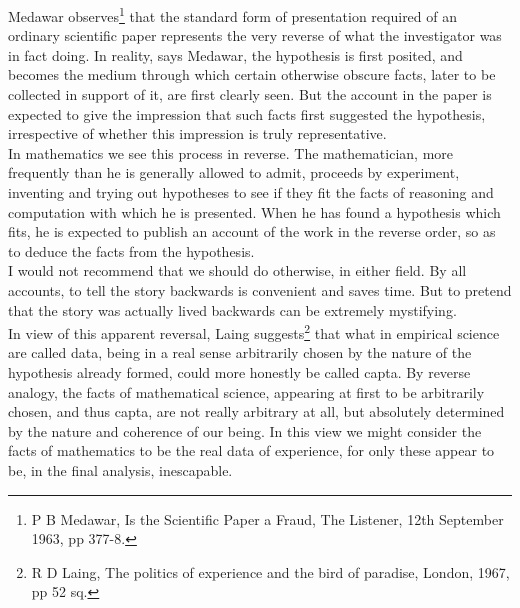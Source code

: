 \documentclass[a4paper]{article}
\theoremstyle{remark}
\begin{document}
Medawar observes\footnote{P B Medawar, Is the Scientific Paper a Fraud, The  Listener, 12th September 1963, pp 377-8.}  that  the  standard  form   of  presentation  required   of  an   ordinary   scientific   paper   represents   the   very   reverse  of  what  the  investigator  was  in  fact  doing.  In  reality,  says  Medawar,  the  hypothesis  is  first  posited,  and  becomes  the  medium  through  which  certain  otherwise  obscure  facts,   later   to  be  collected  in  support  of  it,  are  first  clearly  seen.  But  the  account  in  the  paper  is  expected  to  give  the  impression   that   such  facts  first  suggested  the  hypothesis,  irrespective  of  whether  this  impression  is truly  representative.\\

In  mathematics  we  see  this  process  in  reverse.  The  mathematician, more frequently  than  he  is generally  allowed  to  admit,  proceeds  by  experiment,  inventing  and  trying  out   hypotheses   to  see  if  they  fit  the  facts  of  reasoning  and  computation  with  which  he  is  presented.  When  he  has  found  a  hypothesis  which  fits,  he  is  expected  to  publish  an  account  of  the  work  in  the  reverse  order,  so  as  to  deduce  the  facts  from  the  hypothesis. \\

I   would  not   recommend   that   we  should  do   otherwise,   in   either   field.   By   all  accounts,  to   tell  the   story   backwards   is   convenient  and  saves  time.  But  to  pretend  that  the  story  was  actually  lived  backwards  can  be  extremely  mystifying.\\

In view of this apparent reversal, Laing suggests\footnote{R D Laing, The politics of experience and the bird of paradise, London, 1967, pp 52 sq.}  that  what in empirical  science  are  called  data,  being  in  a  real  sense  arbi­trarily  chosen  by  the  nature  of  the  hypothesis  already  formed,  could  more  honestly  be  called  capta.   By  reverse  analogy,  the  facts  of mathematical  science, appearing at  first to  be  arbitrarily  chosen,   and   thus   capta,   are  not   really   arbitrary   at  all,   but   absolutely  determined  by the nature and  coherence  of our  being.  In  this  view  we  might  consider  the  facts  of  mathematics  to  be  the  real  data  of  experience,  for  only  these  appear  to  be,  in  the  final  analysis,  inescapable. \\
\end{document}
